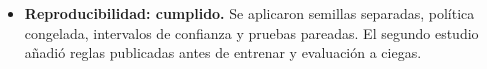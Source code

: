 \begin{itemize}
  \item \textbf{Reproducibilidad: cumplido.} Se aplicaron semillas
    separadas, política congelada, intervalos de confianza y pruebas
    pareadas. El segundo estudio añadió reglas publicadas antes de
    entrenar y evaluación a ciegas.
\end{itemize}

